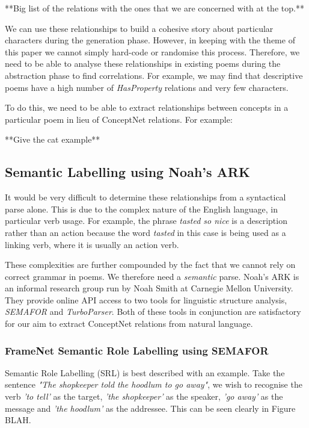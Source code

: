 **Big list of the relations with the ones that we are concerned with at the top.**

We can use these relationships to build a cohesive story about particular characters during the generation phase. However, in keeping with the theme of this paper we cannot simply hard-code or randomise this process. Therefore, we need to be able to analyse these relationships in existing poems during the abstraction phase to find correlations. For example, we may find that descriptive poems have a high number of \textit{HasProperty} relations and very few characters.  

To do this, we need to be able to extract relationships between concepts in a particular poem in lieu of ConceptNet relations. For example:

**Give the cat example**

\subsection{Semantic Labelling using Noah's ARK}

It would be very difficult to determine these relationships from a syntactical parse alone. This is due to the complex nature of the English language, in particular verb usage. For example, the phrase \textit{tasted so nice} is a description rather than an action because the word \textit{tasted} in this case is being used as a linking verb, where it is usually an action verb.

These complexities are further compounded by the fact that we cannot rely on correct grammar in poems. We therefore need a \textit{semantic} parse. Noah's ARK is an informal research group run by Noah Smith at Carnegie Mellon University. They provide online API access to two tools for linguistic structure analysis, \textit{SEMAFOR} and \textit{TurboParser}. Both of these tools in conjunction are satisfactory for our aim to extract ConceptNet relations from natural language.

\subsubsection{FrameNet Semantic Role Labelling using SEMAFOR}

Semantic Role Labelling (SRL) is best described with an example. Take the sentence \textit{"The shopkeeper told the hoodlum to go away"}, we wish to recognise the verb \textit{'to tell'} as the target, \textit{'the shopkeeper'} as the speaker, \textit{'go away'} as the message and \textit{'the hoodlum'} as the addressee. This can be seen clearly in Figure BLAH. 

